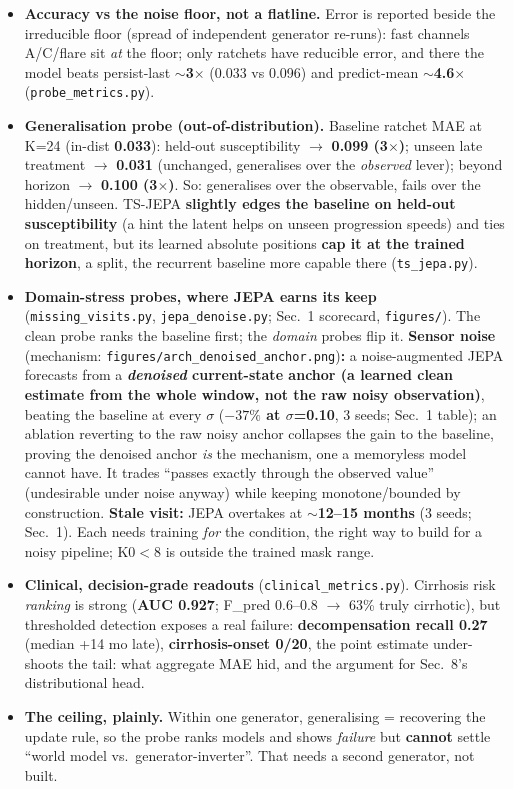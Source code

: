 \begin{itemize}
\item \textbf{Accuracy vs the noise floor, not a flatline.} Error is reported beside the irreducible floor
(spread of independent generator re-runs): fast channels A/C/flare sit \textit{at} the floor; only
ratchets have reducible error, and there the model beats persist-last \textbf{$\sim$3$\times$} (0.033 vs
0.096) and predict-mean \textbf{$\sim$4.6$\times$} (\texttt{probe\_metrics.py}).
\item \textbf{Generalisation probe (out-of-distribution).} Baseline ratchet MAE at K=24 (in-dist
\textbf{0.033}): held-out susceptibility $\to$ \textbf{0.099 (3$\times$)}; unseen late treatment $\to$
\textbf{0.031} (unchanged, generalises over the \textit{observed} lever); beyond horizon $\to$
\textbf{0.100 (3$\times$)}. So: generalises over the observable, fails over the hidden/unseen. TS-JEPA
\textbf{slightly edges the baseline on held-out susceptibility} (a hint the latent helps on unseen
progression speeds) and ties on treatment, but its learned absolute positions \textbf{cap it at the
trained horizon}, a split, the recurrent baseline more capable there (\texttt{ts\_jepa.py}).
\item \textbf{Domain-stress probes, where JEPA earns its keep} (\texttt{missing\_visits.py},
\texttt{jepa\_denoise.py}; Sec.~1 scorecard, \texttt{figures/}). The clean probe ranks the baseline first; the
\textit{domain} probes flip it. \textbf{Sensor noise} (mechanism: \texttt{figures/arch\_denoised\_anchor.png})\textbf{:}
a noise-augmented JEPA forecasts from a \textbf{\textit{denoised} current-state anchor (a learned clean
estimate from the whole window, not the raw noisy observation)}, beating the baseline at every $\sigma$
(\textbf{$-37\%$ at $\sigma$=0.10}, 3 seeds; Sec.~1 table); an ablation reverting to the raw noisy anchor
collapses the gain to the baseline, proving the denoised anchor \textit{is} the mechanism, one a
memoryless model cannot have. It trades ``passes exactly through the observed value'' (undesirable under
noise anyway) while keeping monotone/bounded by construction. \textbf{Stale visit:} JEPA overtakes at
\textbf{$\sim$12--15 months} (3 seeds; Sec.~1). Each needs training \textit{for} the condition, the right
way to build for a noisy pipeline; K0$<$8 is outside the trained mask range.
\item \textbf{Clinical, decision-grade readouts} (\texttt{clinical\_metrics.py}). Cirrhosis risk
\textit{ranking} is strong (\textbf{AUC 0.927}; F\_pred 0.6--0.8 $\to$ 63\% truly cirrhotic), but
thresholded detection exposes a real failure: \textbf{decompensation recall 0.27} (median +14 mo late),
\textbf{cirrhosis-onset 0/20}, the point estimate under-shoots the tail: what aggregate MAE hid, and the
argument for Sec.~8's distributional head.
\item \textbf{The ceiling, plainly.} Within one generator, generalising = recovering the update rule, so
the probe ranks models and shows \textit{failure} but \textbf{cannot} settle ``world model vs.\
generator-inverter''. That needs a second generator, not built.
\end{itemize}

